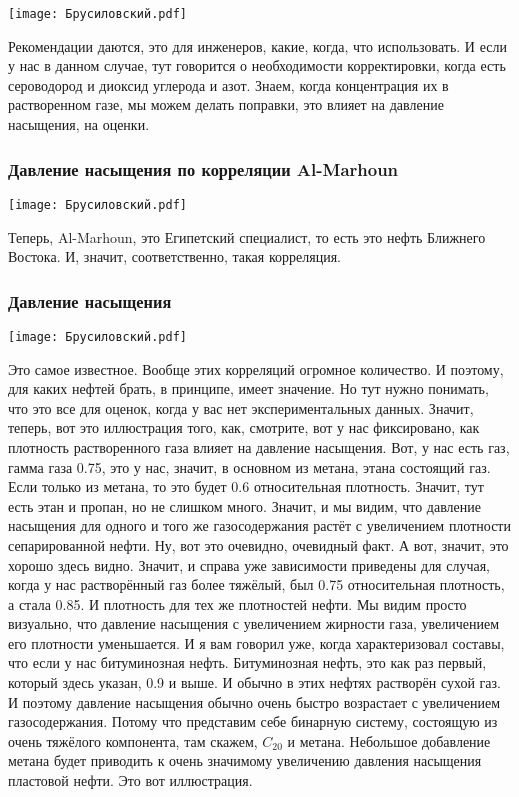 \documentclass[main.tex]{subfiles}
\begin{document}
\begin{center}
\texttt{[image: Брусиловский.pdf]}
\end{center}

Рекомендации даются, это для инженеров, какие, когда, что использовать.
И если у нас в данном случае, тут говорится о необходимости корректировки, когда есть сероводород и диоксид углерода и азот.
Знаем, когда концентрация их в растворенном газе, мы можем делать поправки, это влияет на давление насыщения, на оценки.

\subsubsection{Давление насыщения по корреляции Al-Marhoun}

\begin{center}
\texttt{[image: Брусиловский.pdf]}
\end{center}

Теперь, Al-Marhoun, это Египетский специалист, то есть это нефть Ближнего Востока.
И, значит, соответственно, такая корреляция.

\subsubsection{Давление насыщения}

\begin{center}
\texttt{[image: Брусиловский.pdf]}
\end{center}

Это самое известное. Вообще этих корреляций огромное количество.
И поэтому, для каких нефтей брать, в принципе, имеет значение.
Но тут нужно понимать, что это все для оценок, когда у вас нет экспериментальных данных.
Значит, теперь, вот это иллюстрация того, как, смотрите, вот у нас фиксировано, как плотность растворенного газа влияет на давление насыщения.
Вот, у нас есть газ, гамма газа 0.75, это у нас, значит, в основном из метана, этана состоящий газ.
Если только из метана, то это будет 0.6 относительная плотность.
Значит, тут есть этан и пропан, но не слишком много.
Значит, и мы видим, что давление насыщения для одного и того же газосодержания растёт с увеличением плотности сепарированной нефти.
Ну, вот это очевидно, очевидный факт.
А вот, значит, это хорошо здесь видно.
Значит, и справа уже зависимости приведены для случая, когда у нас растворённый газ более тяжёлый, был 0.75 относительная плотность, а стала 0.85.
И плотность для тех же плотностей нефти.
Мы видим просто визуально, что давление насыщения с увеличением жирности газа, увеличением его плотности уменьшается.
И я вам говорил уже, когда характеризовал составы, что если у нас битуминозная нефть.
Битуминозная нефть, это как раз первый, который здесь указан, 0.9 и выше.
И обычно в этих нефтях растворён сухой газ.
И поэтому давление насыщения обычно очень быстро возрастает с увеличением газосодержания.
Потому что представим себе бинарную систему, состоящую из очень тяжёлого компонента, там скажем, $C_{20}$ и метана.
Небольшое добавление метана будет приводить к очень значимому увеличению давления насыщения пластовой нефти.
Это вот иллюстрация.
\end{document}

